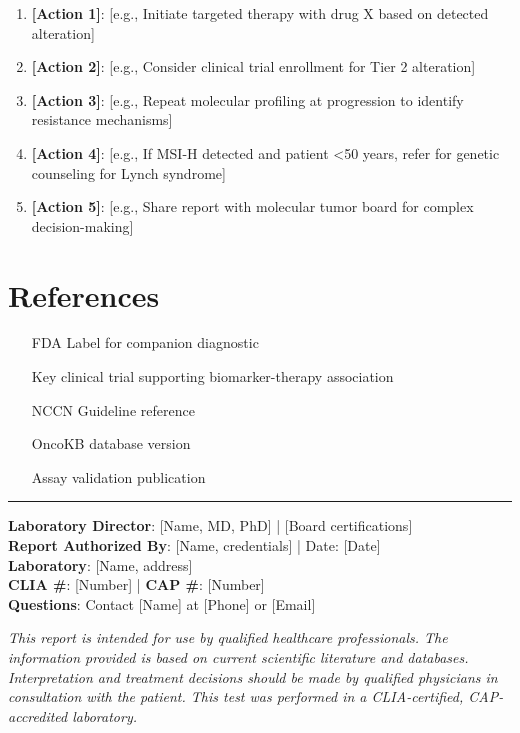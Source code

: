\documentclass[10pt,letterpaper]{article}
\begin{document}
\begin{enumerate}
\item \textbf{[Action 1]}: [e.g., Initiate targeted therapy with drug X based on detected alteration]
\item \textbf{[Action 2]}: [e.g., Consider clinical trial enrollment for Tier 2 alteration]
\item \textbf{[Action 3]}: [e.g., Repeat molecular profiling at progression to identify resistance mechanisms]
\item \textbf{[Action 4]}: [e.g., If MSI-H detected and patient <50 years, refer for genetic counseling for Lynch syndrome]
\item \textbf{[Action 5]}: [e.g., Share report with molecular tumor board for complex decision-making]
\end{enumerate}

\section{References}

\begin{enumerate}
\item [FDA Label for companion diagnostic]
\item [Key clinical trial supporting biomarker-therapy association]
\item [NCCN Guideline reference]
\item [OncoKB database version]
\item [Assay validation publication]
\end{enumerate}

\vspace{10pt}

\hrule
\vspace{4pt}
{\footnotesize
\textbf{Laboratory Director}: [Name, MD, PhD] | [Board certifications]\\
\textbf{Report Authorized By}: [Name, credentials] | Date: [Date]\\
\textbf{Laboratory}: [Name, address]\\
\textbf{CLIA \#}: [Number] | \textbf{CAP \#}: [Number]\\
\textbf{Questions}: Contact [Name] at [Phone] or [Email]

\vspace{2pt}

\textit{This report is intended for use by qualified healthcare professionals. The information provided is based on current scientific literature and databases. Interpretation and treatment decisions should be made by qualified physicians in consultation with the patient. This test was performed in a CLIA-certified, CAP-accredited laboratory.}
}
\end{document}
